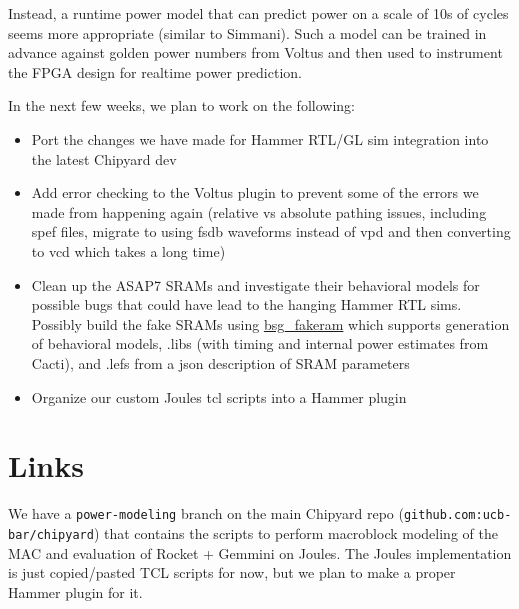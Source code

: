 \documentclass[sigconf]{acmart}
\begin{document}
Instead, a runtime power model that can predict power on a scale of 10s of cycles seems more appropriate (similar to Simmani\cite{simmani}).
Such a model can be trained in advance against golden power numbers from Voltus and then used to instrument the FPGA design for realtime power prediction.

In the next few weeks, we plan to work on the following:
\begin{itemize}
  \item Port the changes we have made for Hammer RTL/GL sim integration into the latest Chipyard dev
  \item Add error checking to the Voltus plugin to prevent some of the errors we made from happening again (relative vs absolute pathing issues, including spef files, migrate to using fsdb waveforms instead of vpd and then converting to vcd which takes a long time)
  \item Clean up the ASAP7 SRAMs and investigate their behavioral models for possible bugs that could have lead to the hanging Hammer RTL sims. Possibly build the fake SRAMs using \href{https://github.com/bespoke-silicon-group/bsg_fakeram}{bsg\_fakeram} which supports generation of behavioral models, .libs (with timing and internal power estimates from Cacti), and .lefs from a json description of SRAM parameters
  \item Organize our custom Joules tcl scripts into a Hammer plugin
\end{itemize}

\appendix
\section{Links}
We have a \texttt{power-modeling} branch on the main Chipyard repo (\texttt{github.com:ucb-bar/chipyard}) that contains the scripts to perform macroblock modeling of the MAC and evaluation of Rocket + Gemmini on Joules.
The Joules implementation is just copied/pasted TCL scripts for now, but we plan to make a proper Hammer plugin for it.
\end{document}
